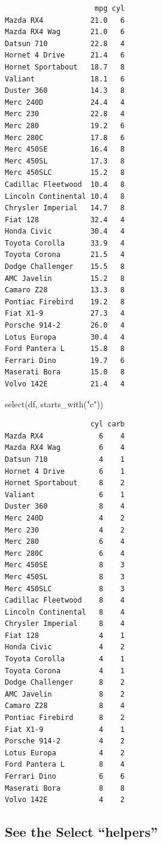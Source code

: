 \documentclass[
]{article}
\newenvironment{Shaded}{\begin{snugshade}}{\end{snugshade}}
\newcommand{\FunctionTok}[1]{\textcolor[rgb]{0.00,0.00,0.00}{#1}}
\newcommand{\NormalTok}[1]{#1}
\newcommand{\StringTok}[1]{\textcolor[rgb]{0.31,0.60,0.02}{#1}}
\begin{document}
\begin{verbatim}
                     mpg cyl
Mazda RX4           21.0   6
Mazda RX4 Wag       21.0   6
Datsun 710          22.8   4
Hornet 4 Drive      21.4   6
Hornet Sportabout   18.7   8
Valiant             18.1   6
Duster 360          14.3   8
Merc 240D           24.4   4
Merc 230            22.8   4
Merc 280            19.2   6
Merc 280C           17.8   6
Merc 450SE          16.4   8
Merc 450SL          17.3   8
Merc 450SLC         15.2   8
Cadillac Fleetwood  10.4   8
Lincoln Continental 10.4   8
Chrysler Imperial   14.7   8
Fiat 128            32.4   4
Honda Civic         30.4   4
Toyota Corolla      33.9   4
Toyota Corona       21.5   4
Dodge Challenger    15.5   8
AMC Javelin         15.2   8
Camaro Z28          13.3   8
Pontiac Firebird    19.2   8
Fiat X1-9           27.3   4
Porsche 914-2       26.0   4
Lotus Europa        30.4   4
Ford Pantera L      15.8   8
Ferrari Dino        19.7   6
Maserati Bora       15.0   8
Volvo 142E          21.4   4
\end{verbatim}

\begin{Shaded}
\begin{Highlighting}[]
\FunctionTok{select}\NormalTok{(df, }\FunctionTok{starts\_with}\NormalTok{(}\StringTok{"c"}\NormalTok{))}
\end{Highlighting}
\end{Shaded}

\begin{verbatim}
                    cyl carb
Mazda RX4             6    4
Mazda RX4 Wag         6    4
Datsun 710            4    1
Hornet 4 Drive        6    1
Hornet Sportabout     8    2
Valiant               6    1
Duster 360            8    4
Merc 240D             4    2
Merc 230              4    2
Merc 280              6    4
Merc 280C             6    4
Merc 450SE            8    3
Merc 450SL            8    3
Merc 450SLC           8    3
Cadillac Fleetwood    8    4
Lincoln Continental   8    4
Chrysler Imperial     8    4
Fiat 128              4    1
Honda Civic           4    2
Toyota Corolla        4    1
Toyota Corona         4    1
Dodge Challenger      8    2
AMC Javelin           8    2
Camaro Z28            8    4
Pontiac Firebird      8    2
Fiat X1-9             4    1
Porsche 914-2         4    2
Lotus Europa          4    2
Ford Pantera L        8    4
Ferrari Dino          6    6
Maserati Bora         8    8
Volvo 142E            4    2
\end{verbatim}

\hypertarget{see-the-select-helpers}{%
\subsection{See the Select ``helpers''}\label{see-the-select-helpers}}
\end{document}
